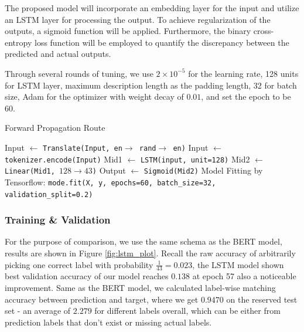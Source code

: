 \documentclass{article}
\begin{document}
The proposed model will incorporate an embedding layer for the input and utilize an LSTM layer for processing the output. To achieve regularization of the outputs, a sigmoid function will be applied. Furthermore, the binary cross-entropy loss function will be employed to quantify the discrepancy between the predicted and actual outputs.

Through several rounds of tuning, we use $2\times 10^{-5}$ for the learning rate, 128 units for LSTM layer, maximum description length as the padding length, 32 for batch size, Adam for the optimizer with weight decay of $0.01$, and set the epoch to be $60$.
\begin{algorithm}
\caption{Forward Propagation Route}\label{alg:cap}
\begin{algorithmic}[1]
\State Input $\gets$ \texttt{Translate(Input, en$\to$ rand$\to$ en)} 
\State Input $\gets$ \texttt{tokenizer.encode(Input)} 
\State Mid1 $\gets$ \texttt{LSTM(input, unit=128)} 
\State Mid2 $\gets$ \texttt{Linear(Mid1, $128\to 43$)} 
\State Output $\gets$ \texttt{Sigmoid(Mid2)} 
\State
\State Model Fitting by Tensorflow:
\State \texttt{mode.fit(X, y, epochs=60, batch\_size=32, validation\_split=0.2)}
\end{algorithmic}
\end{algorithm}

\subsubsection{Training \& Validation}

For the purpose of comparison, we use the same schema as the BERT model, results are shown in Figure \ref{fig:lstm_plot}.
Recall the raw accuracy of arbitrarily picking one correct label with probability ${\displaystyle \frac{1}{43}=0.023}$, the LSTM model shown best validation accuracy of our model reaches $0.138$ at epoch 57 also a noticeable improvement. Same as the BERT model, we calculated label-wise matching accuracy between prediction and target, where we get $0.9470$ on the reserved test set - an average of $2.279$ for different labels overall, which can be either from prediction labels that don't exist or missing actual labels.
\end{document}
